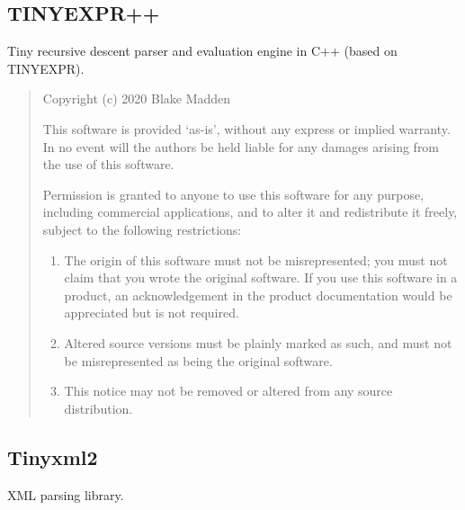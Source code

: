 \documentclass[
]{book}
\providecommand{\tightlist}{%
  \setlength{\itemsep}{0pt}\setlength{\parskip}{0pt}}
\theoremstyle{definition}
\theoremstyle{definition}
\theoremstyle{definition}
\theoremstyle{definition}
\theoremstyle{remark}
\begin{document}
\hypertarget{tinyexpr-1}{%
\subsection*{TINYEXPR++}\label{tinyexpr-1}}

Tiny recursive descent parser and evaluation engine in C++ (based on TINYEXPR).

\begin{quote}
Copyright (c) 2020 Blake Madden

This software is provided `as-is', without any express or implied
warranty. In no event will the authors be held liable for any damages
arising from the use of this software.

Permission is granted to anyone to use this software for any purpose,
including commercial applications, and to alter it and redistribute it
freely, subject to the following restrictions:

\begin{enumerate}
\def\labelenumi{\arabic{enumi}.}
\tightlist
\item
  The origin of this software must not be misrepresented; you must not
  claim that you wrote the original software. If you use this software
  in a product, an acknowledgement in the product documentation would be
  appreciated but is not required.
\item
  Altered source versions must be plainly marked as such, and must not be
  misrepresented as being the original software.
\item
  This notice may not be removed or altered from any source distribution.
\end{enumerate}
\end{quote}

\hypertarget{tinyxml2}{%
\subsection*{Tinyxml2}\label{tinyxml2}}

XML parsing library.
\end{document}
